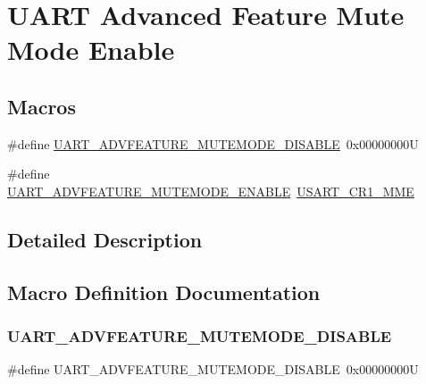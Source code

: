 \hypertarget{group___u_a_r_t___mute___mode}{}\section{U\+A\+RT Advanced Feature Mute Mode Enable}
\label{group___u_a_r_t___mute___mode}
\subsection*{Macros}
\begin{DoxyCompactItemize}
\item 
\#define \mbox{\hyperlink{group___u_a_r_t___mute___mode_ga11b6414641d82b941920c291e19aa042}{U\+A\+R\+T\+\_\+\+A\+D\+V\+F\+E\+A\+T\+U\+R\+E\+\_\+\+M\+U\+T\+E\+M\+O\+D\+E\+\_\+\+D\+I\+S\+A\+B\+LE}}~0x00000000U
\item 
\#define \mbox{\hyperlink{group___u_a_r_t___mute___mode_gaa9ca3763538abf310102ac34e81cdcbc}{U\+A\+R\+T\+\_\+\+A\+D\+V\+F\+E\+A\+T\+U\+R\+E\+\_\+\+M\+U\+T\+E\+M\+O\+D\+E\+\_\+\+E\+N\+A\+B\+LE}}~\mbox{\hyperlink{group___peripheral___registers___bits___definition_ga4ae32b0c22f90fa8295d2ed96c2fd54d}{U\+S\+A\+R\+T\+\_\+\+C\+R1\+\_\+\+M\+ME}}
\end{DoxyCompactItemize}


\subsection{Detailed Description}


\subsection{Macro Definition Documentation}
\mbox{\label{group___u_a_r_t___mute___mode_ga11b6414641d82b941920c291e19aa042}} 
\subsubsection{\texorpdfstring{UART\_ADVFEATURE\_MUTEMODE\_DISABLE}{UART\_ADVFEATURE\_MUTEMODE\_DISABLE}}
{\footnotesize\ttfamily \#define U\+A\+R\+T\+\_\+\+A\+D\+V\+F\+E\+A\+T\+U\+R\+E\+\_\+\+M\+U\+T\+E\+M\+O\+D\+E\+\_\+\+D\+I\+S\+A\+B\+LE~0x00000000U}

